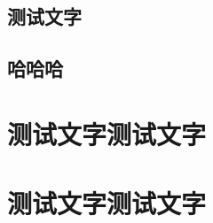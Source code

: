 \documentclass[themecolor=brown]{textbook-cn}
\begin{document}
\cleardoublepage

\lipsum



\chapter{测试文字}

\chapter{哈哈哈}
\lipsum


\partintro{\lipsum[2]}
\part*{测试文字测试文字}

\zhlipsum


\partsubtitle{ }
\partintro{\lipsum[2]}
\part*{测试文字测试文字}

\zhlipsum
\end{document}
